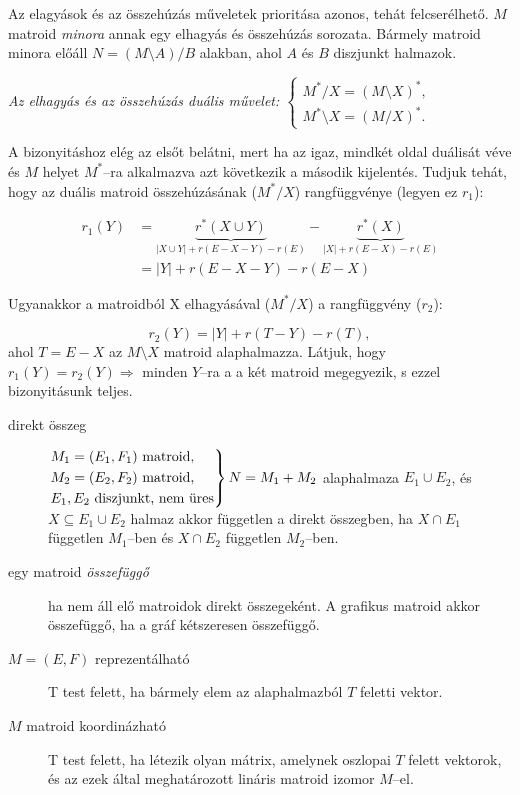Az elagyások és az összehúzás műveletek prioritása azonos, tehát felcserélhető. $M$ matroid 
\emph{minora} annak egy elhagyás és összehúzás sorozata. Bármely matroid minora előáll
$N=(M \setminus A) / B$ alakban, ahol $A$ és $B$ diszjunkt halmazok.

\emph{Az elhagyás és az összehúzás duális művelet: $\begin{cases}
M^*/X=(M \setminus X)^*, \\
M^* \setminus X = (M / X)^*.
\end{cases}$}

A bizonyitáshoz elég az elsőt belátni, mert ha az igaz, mindkét oldal duálisát
véve és $M$ helyet $M^*$--ra alkalmazva azt következik a második kijelentés.
Tudjuk tehát, hogy az duális matroid összehúzásának ($M^*/X$) rangfüggvénye
(legyen ez $r_1$):

\begin{align*}
r_1(Y) &=\underbrace{r^*(X \cup Y)}_{|X \cup Y| + r(E-X-Y) - r(E)} - 
		 \underbrace{r^*(X)}_{|X| + r(E-X) - r(E)} \\
	   &= |Y| + r(E-X-Y) - r(E-X) 
\end{align*}

Ugyanakkor a matroidból X elhagyásával ($M^*/X$) a rangfüggvény ($r_2$):

\[ r_2(Y) = |Y| + r(T-Y) - r(T),\] ahol $T = E-X$ az $M\setminus X$ matroid
alaphalmazza. Látjuk, hogy $r_1(Y)=r_2(Y)\Rightarrow$ minden $Y$--ra a a két
matroid megegyezik, s ezzel bizonyitásunk teljes.

\begin{description}
  \item[direkt összeg] $\begin{rcases}
  M_1=(E_1,F_1) \mbox{ matroid}, \\
  M_2=(E_2,F_2) \mbox{ matroid}, \\
  E_1, E_2 \mbox{ diszjunkt, nem üres} \end{rcases} N = M_1+ M_2$ alaphalmaza
  $E_1 \cup E_2$, és $X \subseteq E_1 \cup E_2$ halmaz akkor független a direkt
  összegben, ha $X \cap E_1$ független $M_1$--ben és $X \cap E_2$ független
  $M_2$--ben. 
  \item[egy matroid \emph{összefüggő}] ha nem áll elő matroidok direkt
  összegeként. A grafikus matroid akkor összefüggő, ha a gráf kétszeresen
  összefüggő.
  \item[$M=(E,F)$ reprezentálható] T test felett, ha bármely elem az alaphalmazból
  $T$ feletti vektor. 
  \item[$M$ matroid koordinázható]T test felett, ha létezik olyan mátrix, amelynek oszlopai
  $T$ felett vektorok, és az ezek által meghatározott lináris matroid izomor $M$--el. 
\end{description}

